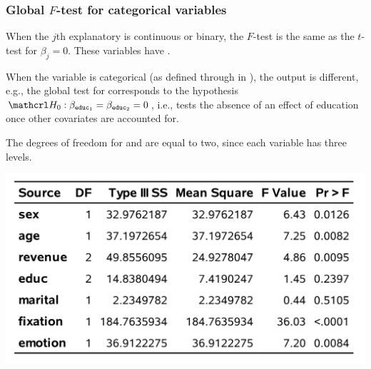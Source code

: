 \documentclass{beamer}
\begin{document}
\begin{frame}[fragile]
\frametitle{Global $F$-test for categorical variables}
{\small 
\bi
\item When the $j$th explanatory is continuous or binary, the $F$-test is the \alert{same} as the $t$-test for $\beta_j=0$. These variables have .
\item When the variable is categorical (as defined through  in \SASlang), the output is different, e.g., the global test for  corresponds to the hypothesis $\Hy_0: \beta_{\code{educ}_1}=\beta_{\code{educ}_2}=0$, i.e.,  tests the absence of an effect of education once other covariates are accounted for.
\item The degrees of freedom for  and  are equal to two, since each variable has three levels.
\ei
}
\begin{center}
\includegraphics[width = 0.7\linewidth]{img/c2/slides3-e10.png}
\end{center}

\end{frame}
\end{document}
